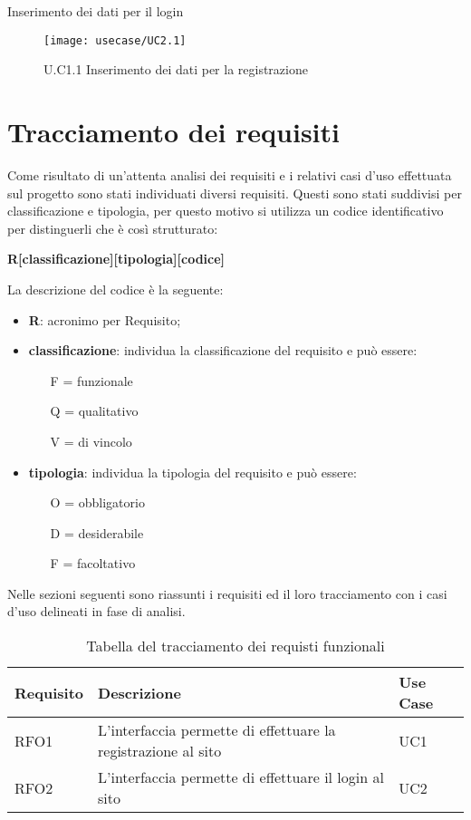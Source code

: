 \begin{usecase}{2.1}{Inserimento dei dati per il login}
	\begin{figure}[H] 
		\centering 
		\texttt{[image: usecase/UC2.1]} 
		\caption{U.C1.1 Inserimento dei dati per la registrazione}
	\end{figure}
\usecasepre{}
\usecasedesc{}
\usecasepost{}
\end{usecase}

\section{Tracciamento dei requisiti}

Come risultato di un'attenta analisi dei requisiti e i relativi casi d'uso effettuata sul progetto sono stati individuati diversi requisiti. Questi sono stati suddivisi per classificazione e tipologia, per questo motivo si utilizza un codice identificativo per distinguerli che è così strutturato:
\begin{center}
	\textbf{R[classificazione][tipologia][codice]}
\end{center}
La descrizione del codice è la seguente:
\begin{itemize}
	\item \textbf{R}: acronimo per Requisito;
	\item \textbf{classificazione}: individua la classificazione del requisito e può essere:
	\begin{itemize}
		\item [F =] funzionale
		\item [Q =] qualitativo
		\item [V =]  di vincolo
	\end{itemize}
	\item \textbf{tipologia}: individua la tipologia del requisito e può essere:
	\begin{itemize}
		\item [O =] obbligatorio
		\item [D =] desiderabile
		\item [F =] facoltativo
	\end{itemize}
\end{itemize}

Nelle sezioni seguenti sono riassunti i requisiti ed il loro tracciamento con i casi d'uso delineati in fase di analisi.

\begin{table}%
\caption{Tabella del tracciamento dei requisti funzionali}
\label{tab:requisiti-funzionali}
\begin{tabularx}{\textwidth}{lXl}
\hline\hline
\textbf{Requisito} & \textbf{Descrizione} & \textbf{Use Case}\\
\hline
RFO1 & L'interfaccia permette di effettuare la registrazione al sito & UC1 \\
\hline
RFO2 & L'interfaccia permette di effettuare il login al sito & UC2 \\
\hline
\end{tabularx}
\end{table}%

